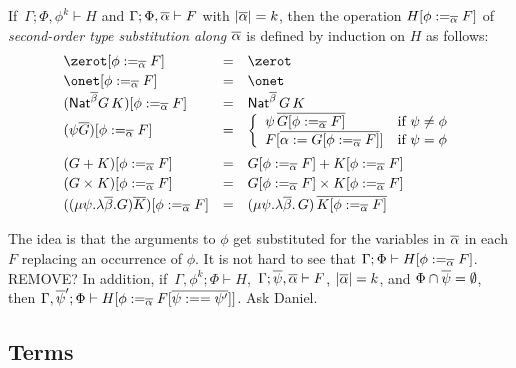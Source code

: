 \documentclass{lmcs}
\theoremstyle{plain}\newtheorem{satz}[thm]{Satz}
\begin{document}
{\begin{defi}\label{def:second-order-subst}
If \,$\Gamma; \Phi,\phi^k \vdash H$ and $\Gamma;\Phi, \overline{\alpha}
\vdash F$ with $|\overline{\alpha}| = k$, then the operation $H[\phi :=_{\overline{\alpha}} F]$ of {\em second-order type substitution along
  $\overline{\alpha}$} is defined by induction on $H$ as follows:
\[\begin{array}{lll}
\zerot[\phi :=_{\ol{\alpha}} F] & = & \zerot\\[0.5ex]
\onet[\phi :=_{\ol{\alpha}} F] & = & \onet\\[0.25ex]
(\Nat^{\ol\beta} G \,K)[\phi :=_{\ol{\alpha}} F]
& = & \Nat^{\ol\beta}\, G \,K\\
(\psi\ol{G})[\phi :=_{\ol{\alpha}} F] & = &
\left\{\begin{array}{ll}
\psi \,\ol{G[\phi :=_{\ol{\alpha}} F]} & \mbox{if } \psi \not = \phi\\
  F[\ol{\alpha  := G[\phi :=_{\ol{\alpha}} F]}] 
  & \mbox{if } \psi = \phi
\end{array}\right.\\[2.8ex]
(G + K)[\phi :=_{\ol{\alpha}} F] & = & G[\phi
  :=_{\ol{\alpha}} F] + K[\phi :=_{\ol{\alpha}} F]\\[0.5ex] 
(G \times K)[\phi :=_{\ol{\alpha}} F] & = &
G[\phi :=_{\ol{\alpha}} F] \times K[\phi
  :=_{\ol{\alpha}} F]\\[0.5ex]   
((\mu \psi. \lambda \ol{\beta}. G)\ol{K})[\phi :=_{\ol{\alpha}}
  F] & = & (\mu \psi. \lambda \ol{\beta}. \,G)\, \ol{K[\phi :=_{\ol{\alpha}} F]}
\end{array}\]
\end{defi}
\noindent
The idea is that the arguments to $\phi$ get substituted for the
variables in $\overline{\alpha}$ in each $F$ replacing an occurrence of
$\phi$. It is not hard to see that $\Gamma;\Phi \vdash H[\phi
  :=_{\overline{\alpha}} F]$. {\color{red} REMOVE? In addition, if
  \,$\Gamma, \phi^k; \Phi \vdash H$,\, $\Gamma; \overline{\psi},\overline{\alpha}
  \vdash F$, $|\overline{\alpha}| = k$, and $\Phi \cap \overline{\psi} = \emptyset$,
  then $\Gamma,\overline{\psi}';\Phi \vdash H[\phi :=_{\overline{\alpha}} F[\overline{\psi
        :== \psi'}]]$. Ask Daniel.}

\subsection{Terms}\label{sec:terms}

\begin{figure*}


\end{figure*}}
\end{document}
